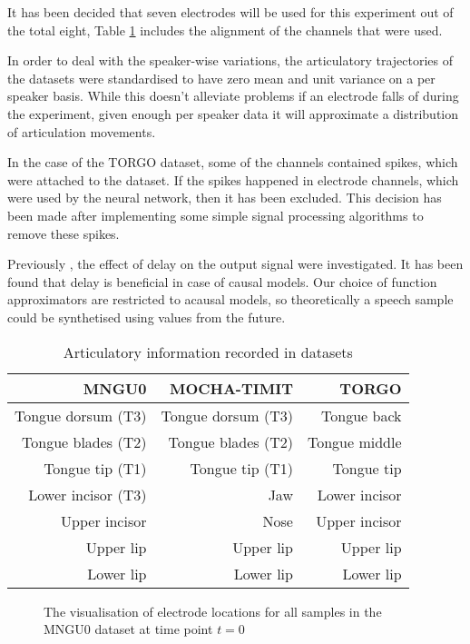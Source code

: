 \documentclass[a4paper]{article}
\begin{document}
It has been decided that seven electrodes will be used for this experiment out of the total eight,
Table \ref{tab:electrodes} includes the alignment of the channels that were used.

In order to deal with the speaker-wise variations, the articulatory trajectories of
the datasets were standardised to have zero mean
and unit variance on a per speaker basis. While this doesn't alleviate problems if an electrode
falls of during the experiment, given enough per speaker data it will approximate a distribution
of articulation movements.

In the case of the TORGO dataset, some of the channels contained spikes, which
were attached to the dataset. If the spikes happened in electrode channels, which were used
by the neural network, then it has been excluded. This decision has been made after implementing
some simple signal processing algorithms to remove these spikes.

Previously \cite{Gonzalez2016}, the effect of delay on the
output signal were investigated. It has been found that delay
is beneficial in case of causal models. Our choice of function approximators are
restricted to acausal models, so theoretically a speech sample could be synthetised using
values from the future.

\begin{table}[th]
  \caption{Articulatory information recorded in datasets}
  \label{tab:electrodes}
  \centering
  \begin{tabular}{ r r r  }
    \toprule
    \textbf{MNGU0} & \textbf{MOCHA-TIMIT} & \textbf{TORGO} \\ 
    \midrule
    Tongue dorsum (T3) & Tongue dorsum (T3) & Tongue back \\
    Tongue blades (T2) & Tongue blades (T2) & Tongue middle \\
    Tongue tip (T1) & Tongue tip (T1) & Tongue tip \\
    Lower incisor (T3) & Jaw & Lower incisor\\
    Upper incisor & Nose & Upper incisor\\
    Upper lip & Upper lip & Upper lip \\
    Lower lip & Lower lip  & Lower lip\\
    \bottomrule
    \end{tabular}
\end{table}


\begin{figure}[t]
  \begin{center}
    \scalebox{0.50}{}
  \caption{The visualisation of electrode locations for all samples in
    the MNGU0 dataset at time point \( t = 0 \)}
\end{center}
\end{figure}
\end{document}
